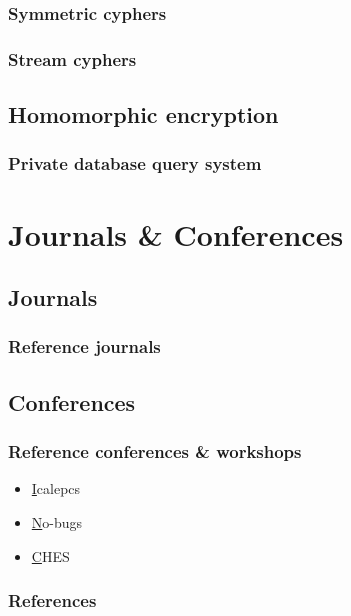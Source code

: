 \documentclass{beamer}
\begin{document}
\begin{frame}
\frametitle{Symmetric cyphers}
\end{frame}

\begin{frame}
\frametitle{Stream cyphers}
\end{frame}

\subsection{Homomorphic encryption}

\begin{frame}
\frametitle{Private database query system}
\end{frame}

\section{Journals \& Conferences}

\subsection{Journals}

\begin{frame}
\frametitle{Reference journals}
\end{frame}

\subsection{Conferences}

\begin{frame}
\frametitle{Reference conferences \& workshops}
\begin{itemize}
    \item \href{http://www.icalepcs.org/}Icalepcs
    \item \href{http://www.nobugsconference.org/} No-bugs
    \item \href{http://www.chesworkshop.org/} CHES
\end{itemize}

\end{frame}

\begin{frame}[allowframebreaks]
        \frametitle{References}
        
        
\end{frame}
\end{document}
